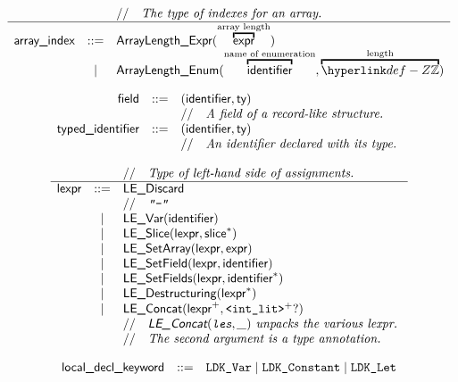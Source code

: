 \documentclass{book}
\begin{document}
\[
  \begin{array}{rcl}
    & & \ASTComment{The type of indexes for an array.}  \\
    \hline
    \arrayindex & ::=
      & \ArrayLengthExpr(\overtext{\expr}{array length}) \\
    &|& \ArrayLengthEnum(\overtext{\identifier}{name of enumeration}, \overtext{\Z}{length}) \\
  \end{array}
\]

\[
\begin{array}{rcl}
\textsf{field} &::=& (\textsf{identifier}, \textsf{ty})\\
  & & //\quad\textit{A field of a record-like structure.}\ \\
\textsf{typed\_identifier} &::=& (\textsf{identifier}, \textsf{ty})\\
  & & //\quad\textit{An identifier declared with its type.}\ \\
\end{array}
\]

\[
\begin{array}{rcl}
& & //\quad\textit{Type of left-hand side of assignments.}\ \\
\hline
\textsf{lexpr} &::=& \textsf{LE\_Discard}\\
  & & //\quad\textit{\texttt{"-"}}\ \\
  &|& \textsf{LE\_Var}(\textsf{identifier})\\
  &|& \textsf{LE\_Slice}(\textsf{lexpr}, \textsf{slice}^*)\\
  &|& \textsf{LE\_SetArray}(\textsf{lexpr}, \textsf{expr})\\
  &|& \textsf{LE\_SetField}(\textsf{lexpr}, \textsf{identifier})\\
  &|& \textsf{LE\_SetFields}(\textsf{lexpr}, \textsf{identifier}^*)\\
  &|& \textsf{LE\_Destructuring}(\textsf{lexpr}^*)\\
  &|& \textsf{LE\_Concat}(\textsf{lexpr}^+, \texttt{<int\_lit>}^+?)\\
  & & //\quad\textit{$\textsf{LE\_Concat}(\texttt{les}, \_)$ unpacks the various lexpr.}\ \\
  & & //\quad\textit{The second argument is a type annotation.}\ \\
\end{array}
\]

\[
\begin{array}{rcl}
\textsf{local\_decl\_keyword} &::=& \texttt{LDK\_Var} \;|\; \texttt{LDK\_Constant} \;|\; \texttt{LDK\_Let}\\
\end{array}
\]
\end{document}
